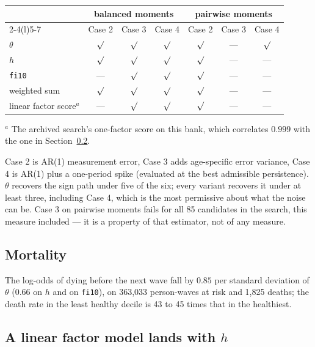 \documentclass[11pt]{article}
\newcommand{\code}[1]{\texttt{\small #1}}
\begin{document}
\begin{center}\small
\begin{tabular}{lcccccc}
\toprule
 & \multicolumn{3}{c}{balanced moments} & \multicolumn{3}{c}{pairwise moments} \\
\cmidrule(lr){2-4}\cmidrule(l){5-7}
 & Case 2 & Case 3 & Case 4 & Case 2 & Case 3 & Case 4 \\
\midrule
$\theta$ & $\surd$ & $\surd$ & $\surd$ & $\surd$ & --- & $\surd$ \\
$h$ & $\surd$ & $\surd$ & $\surd$ & $\surd$ & --- & --- \\
\code{fi10} & --- & $\surd$ & $\surd$ & $\surd$ & --- & --- \\
weighted sum & $\surd$ & $\surd$ & $\surd$ & $\surd$ & --- & --- \\
linear factor score$^{a}$ & --- & $\surd$ & $\surd$ & $\surd$ & --- & --- \\
\bottomrule
\end{tabular}

\smallskip\footnotesize $^{a}$ The archived search's one-factor score on this bank, which correlates $0.999$ with the one in Section~\ref{sec:factor}.
\end{center}

Case 2 is AR(1) measurement error, Case 3 adds age-specific error variance,
Case 4 is AR(1) plus a one-period spike (evaluated at the best admissible
persistence). $\theta$ recovers the sign path under five of the six; every
variant recovers it under at least three, including Case 4, which is the most
permissive about what the noise can be. Case 3 on pairwise moments fails for
all 85 candidates in the search, this measure included --- it is a property of
that estimator, not of any measure.

\subsection{Mortality}

The log-odds of dying before the next wave fall by $0.85$ per standard
deviation of $\theta$ ($0.66$ on $h$ and on \code{fi10}), on 363,033
person-waves at risk and 1,825 deaths; the death rate in the least healthy
decile is 43 to 45 times that in the healthiest.

\subsection{A linear factor model lands with $h$}
\label{sec:factor}
\end{document}
